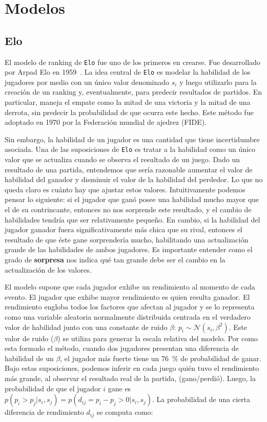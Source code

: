 \documentclass[11pt,twoside,spanish]{report} %
\begin{document}
\section{Modelos}\label{Sec:Modelos}


\subsection{Elo}

El modelo de ranking de \texttt{Elo} fue uno de los primeros en crearse. 
Fue desarrollado por Arpad Elo en 1959~\cite{elo1961-uscf,Elo2008}.
La idea central de \texttt{Elo} es modelar la habilidad de los jugadores por medio con un \'unico valor denominado $s_i$ y luego utilizarlo para la creaci\'on de un ranking y, eventualmente, para predecir resultados de partidos.
En particular, maneja el empate como la mitad de una victoria y la mitad de una derrota, sin predecir la probabilidad de que ocurra este hecho.
Este m\'etodo fue adoptado en 1970 por la Federaci\'on mundial de ajedrez (FIDE).

Sin embargo, la habilidad de un jugador es una cantidad que tiene incertidumbre asociada.
Una de las suposiciones de \texttt{Elo} es tratar a la habilidad como un \'unico valor que se actualiza cuando se observa el resultado de un juego.
Dado un resultado de una partida, entendemos que ser\'ia razonable aumentar el valor de habilidad del ganador y disminuir el valor de la habilidad del perdedor.
Lo que no queda claro es cu\'anto hay que ajustar estos valores.
Intuitivamente podemos pensar lo siguiente: si el jugador que gan\'o posee una habilidad mucho mayor que el de su contrincante, entonces no nos sorprende este resultado, y el cambio de habilidades tendr\'ia que ser relativamente peque\~no.
En cambio, si la habilidad del jugador ganador fuera significativamente m\'as chica que su rival, entonces el resultado de que \'este gane sorprender\'ia mucho, habilitando una actualizaci\'on grande de las habilidades de ambos jugadores.
Es importante entender como el grado de \textbf{sorpresa} nos indica qu\'e tan grande debe ser el cambio en la actualizaci\'on de los valores.


El modelo supone que cada jugador exhibe un rendimiento al momento de cada evento. 
El jugador que exhibe mayor rendimiento es quien resulta ganador.
El rendimiento engloba todos los factores que afectan al jugador y se lo representa como una variable aleatoria normalmente distribuida centrada en el verdadero valor de habilidad junto con una constante de ruido $\beta$: $p_i\sim \mathcal{N}(s_i,\beta^2)$.
Este valor de ruido ($\beta$) se utiliza para generar la escala relativa del modelo.
Por como esta formado el m\'etodo, cuando dos jugadores presentan una diferencia de habilidad de un $\beta$, el jugador m\'as fuerte tiene un \SI{76}{\percent} de probabilidad de ganar.
Bajo estas suposiciones, podemos inferir en cada juego qui\'en tuvo el rendimiento m\'as grande, al observar el resultado real de la partida, (gano/perdi\'o).
Luego, la probabilidad de que el jugador $i$ gane es $p(p_i>p_j|s_i,s_j)=p(d_{ij}=p_i-p_j>0|s_i,s_j)$.
La probabilidad de una cierta diferencia de rendimiento $d_{ij}$ se computa como:
\end{document}
